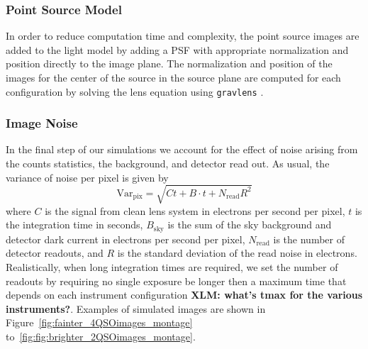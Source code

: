 \documentclass[a4paper,11pt]{article}
\begin{document}
\subsubsection{Point Source Model}

In order to reduce computation time and complexity, the point source
images are added to the light model by adding a PSF with appropriate
normalization and position directly to the image plane. The
normalization and position of the images for the center of the source
in the source plane are computed for each configuration by solving the
lens equation using \texttt{gravlens} \cite{2011ascl.soft02003K}.


%


\subsubsection{Image Noise}

In the final step of our simulations we account for the effect of
noise arising from the counts statistics, the background, and detector
read out. As usual, the variance of noise per pixel is given by
%
\begin{equation}
   \label{eq:noise}
   \mathrm{Var}_{\mathrm{pix}} = \sqrt{Ct+B\cdot t + N_{\mathrm{read}} R^{2}}
\end{equation}
%
where $C$ is the signal from clean lens system in electrons per second
per pixel, $t$ is the integration time in seconds, $B_{\mathrm{sky}}$
is the sum of the sky background and detector dark current in
electrons per second per pixel, $N_{\mathrm{read}}$ is the number of
detector readouts, and $R$ is the standard deviation of the read noise
in electrons. Realistically, when long integration times are required,
we set the number of readouts by requiring no single exposure be
longer then a maximum time that depends on each instrument
configuration {\bf XLM: what's tmax for the various instruments?}.
Examples of simulated images are shown in
Figure~\ref{fig:fainter_4QSOimages_montage}
to~\ref{fig:fig:brighter_2QSOimages_montage}.
\end{document}
